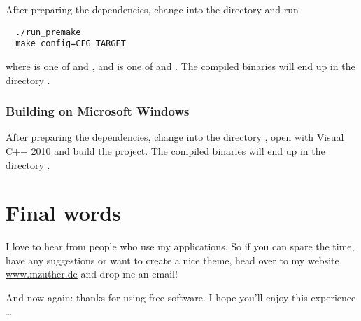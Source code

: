 After preparing the dependencies, change into the directory  and
run

\begin{verbatim}
  ./run_premake
  make config=CFG TARGET
\end{verbatim}

where  is one of  and
, and  is one of
 and .  The
compiled binaries will end up in the directory .

\subsubsection{Building on Microsoft Windows}

After preparing the dependencies, change into the directory
, open  with Visual C++
2010 and build the project.  The compiled binaries will end up in the
directory .

\section{Final words}

I love to hear from people who use my applications.  So if you can
spare the time, have any suggestions or want to create a nice theme,
head over to my website \href{http://www.mzuther.de/}{www.mzuther.de}
and drop me an email!

And now again: thanks for using free software.  I hope you’ll enjoy
this experience \dots




